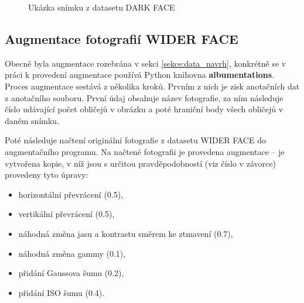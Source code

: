 \begin{figure}[H]
  \begin{center}
  \label{obrazek:darkfaceexample}
  \caption{Ukázka snímku z datasetu DARK FACE}
  \end{center}
\end{figure}

\subsection*{Augmentace fotografií WIDER FACE}
Obecně byla augmentace rozebrána v sekci \ref{sekce:data_navrh}, konkrétně se v práci k provedení augmentace používá Python knihovna \textbf{albumentations}. Proces augmentace sestává z několika kroků. Prvním z nich
je zisk anotačních dat z anotačního souboru. První údaj obsahuje název fotografie, za ním následuje číslo udávající počet obličejů v obrázku a poté hraniční body všech obličejů v daném snímku.

Poté následuje načtení originální fotografie z datasetu WIDER FACE do augmentačního programu. Na načtené fotografii je provedena augmentace -- je vytvořena kopie, v níž jsou s určitou pravděpodobností (viz číslo v závorce) provedeny tyto úpravy:

\begin{itemize}
  \item horizontální převrácení (0.5),
  \item vertikální převrácení (0.5),
  \item náhodná změna jasu a kontrastu směrem ke ztmavení (0.7),
  \item náhodná změna gammy (0.1),
  \item přidání Gaussova šumu (0.2),
  \item přidání ISO šumu (0.4).
\end{itemize}

